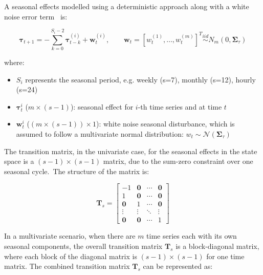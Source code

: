     A seasonal effects modelled using a deterministic approach along with a white noise error term~\cite{qiu_multivariate_2018} is:

    \begin{equation}
        \bm{\tau}_{t+1} = - \sum_{k=0}^{S_{i}-2} \bm{\tau}_{t-k}^{(i)} + \bm{w}_{t}^{(i)},
            \qquad \bm{w}_{t} = [w_{t}^{(1)}, \ldots, w_{t}^{(m)}]^{T}
            \stackrel{\textit{iid}}{\sim} N_{m}(0, \bm{\Sigma}_{\tau})
        \label{eq:seasonal}
    \end{equation}

    where:
    \begin{itemize}
        \item $S_{i}$ represents the seasonal period, e.g. weekly (s=7), monthly (s=12), hourly (s=24)
        \item $\bm{\tau}_{t}^{i}$ ($m \times (s-1)$): seasonal effect for $i$-th time series and at time $t$
        \item $\bm{w}_{t}^{i}$ ($(m \times (s-1)) \times 1$): white noise seasonal disturbance,
            which is assumed to follow a multivariate normal distribution: $w_{t} \sim \mathcal{N}(\bm{\Sigma}_{\tau})$
    \end{itemize}

    The transition matrix, in the univariate case, for the seasonal effects in the state space is a $(s-1) \times (s-1)$ matrix,
    due to the sum-zero constraint over one seasonal cycle.\ The structure of the matrix is:

    \begin{equation}
        \mathbf{T}_s=
            \left[
                \begin{array}{cccc}
                    -1             & \mathbf{0} & \cdots & \mathbf{0} \\
                    1              & \mathbf{0} & \cdots & \mathbf{0} \\
                    \mathbf{0}     & 1          & \cdots & \mathbf{0} \\
                    \vdots         & \vdots     & \ddots & \vdots     \\
                    \mathbf{0}     & \mathbf{0} & \cdots & 1
                \end{array}
            \right]
    \label{eq:seasonal_transition_uni}
    \end{equation}

    In a multivariate scenario, when there are $m$ time series each with its own seasonal components,
    the overall transition matrix $\mathbf{T}_s$ is a block-diagonal matrix, where each block of the diagonal matrix
    is $(s-1) \times (s-1)$ for one time matrix.
    The combined transition matrix $\mathbf{T}_{s}$ can be represented as:

